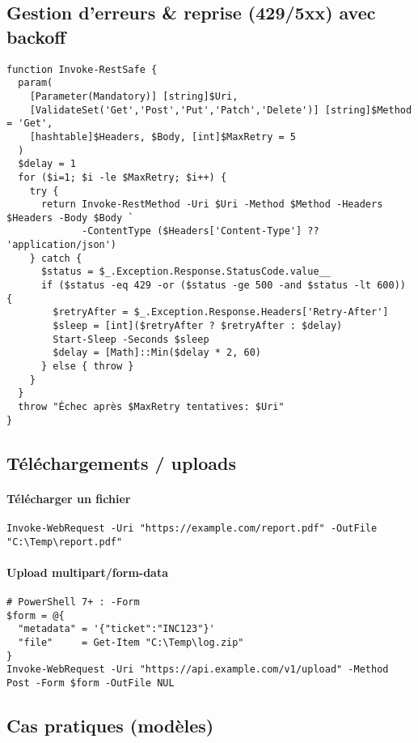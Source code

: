 \documentclass[a4paper,12pt]{article}
\begin{document}
\subsection{Gestion d’erreurs \& reprise (429/5xx) avec backoff}
\begin{verbatim}
function Invoke-RestSafe {
  param(
    [Parameter(Mandatory)] [string]$Uri,
    [ValidateSet('Get','Post','Put','Patch','Delete')] [string]$Method = 'Get',
    [hashtable]$Headers, $Body, [int]$MaxRetry = 5
  )
  $delay = 1
  for ($i=1; $i -le $MaxRetry; $i++) {
    try {
      return Invoke-RestMethod -Uri $Uri -Method $Method -Headers $Headers -Body $Body `
             -ContentType ($Headers['Content-Type'] ?? 'application/json')
    } catch {
      $status = $_.Exception.Response.StatusCode.value__
      if ($status -eq 429 -or ($status -ge 500 -and $status -lt 600)) {
        $retryAfter = $_.Exception.Response.Headers['Retry-After']
        $sleep = [int]($retryAfter ? $retryAfter : $delay)
        Start-Sleep -Seconds $sleep
        $delay = [Math]::Min($delay * 2, 60)
      } else { throw }
    }
  }
  throw "Échec après $MaxRetry tentatives: $Uri"
}
\end{verbatim}

\subsection{Téléchargements / uploads}
\paragraph{Télécharger un fichier}
\begin{verbatim}
Invoke-WebRequest -Uri "https://example.com/report.pdf" -OutFile "C:\Temp\report.pdf"
\end{verbatim}

\paragraph{Upload multipart/form-data}
\begin{verbatim}
# PowerShell 7+ : -Form
$form = @{
  "metadata" = '{"ticket":"INC123"}'
  "file"     = Get-Item "C:\Temp\log.zip"
}
Invoke-WebRequest -Uri "https://api.example.com/v1/upload" -Method Post -Form $form -OutFile NUL
\end{verbatim}

\subsection{Cas pratiques (modèles)}
\end{document}

